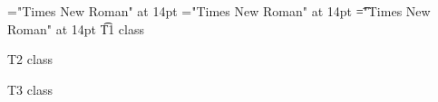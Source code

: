 \font\vxt="Times New Roman" at 14pt
\font\xt="Times New Roman" at 14pt
\font\t="Times New Roman" at 14pt
\t T1 class 

\xt T2 class 

\vxt T3 class 


\bye
